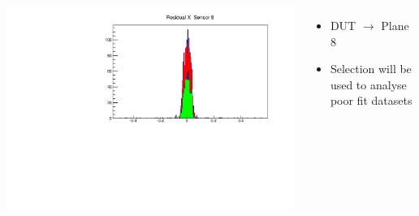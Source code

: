 \documentclass{beamer}
\begin{document}
\begin{frame}
\begin{columns}[t]
\includegraphics[width=1\linewidth]{pics/resXCut-5_5MicronErr.pdf}\\ 
\begin{itemize}
\item DUT $\rightarrow$ Plane 8
\item Selection will be used to analyse poor fit datasets
\end{itemize}
\end{columns}
\vspace{5pt}
\end{frame}
\end{document}
